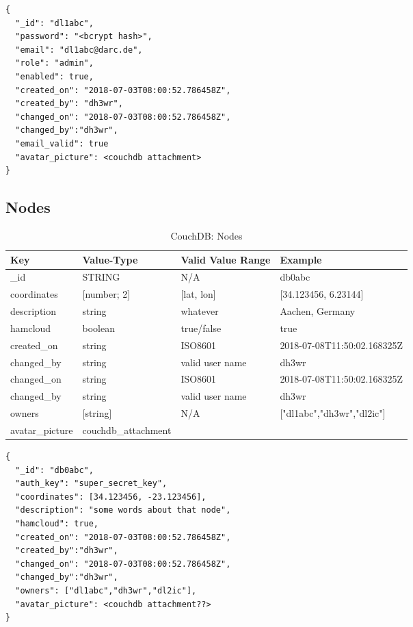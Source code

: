 \begin{lstlisting}
{
  "_id": "dl1abc",
  "password": "<bcrypt hash>",
  "email": "dl1abc@darc.de",
  "role": "admin",
  "enabled": true,
  "created_on": "2018-07-03T08:00:52.786458Z",
  "created_by": "dh3wr",
  "changed_on": "2018-07-03T08:00:52.786458Z",
  "changed_by":"dh3wr",
  "email_valid": true
  "avatar_picture": <couchdb attachment>
}
\end{lstlisting}


\subsection{Nodes}
\begin{table}[h]
 \caption{CouchDB: Nodes}
 \begin{tabular}{|l|l|l|l|} \hline
  Key & Value-Type & Valid Value Range & Example \\
  \hline
  \_id & STRING & N/A & db0abc \\
  coordinates & [number; 2]  & [lat, lon] & [34.123456, 6.23144] \\
  description & string & whatever & Aachen, Germany\\
  hamcloud & boolean & true/false & true \\
  created\_on & string & ISO8601 & 2018-07-08T11:50:02.168325Z \\
  changed\_by & string & valid user name & dh3wr \\
  changed\_on & string & ISO8601 & 2018-07-08T11:50:02.168325Z \\
  changed\_by & string & valid user name & dh3wr \\
  owners & [string] & N/A & ["dl1abc","dh3wr","dl2ic"] \\
  avatar\_picture & couchdb\_attachment & & \\ \hline
  \end{tabular}
  \label{tab:couchdb:nodes}
\end{table}

\begin{lstlisting}
{
  "_id": "db0abc",
  "auth_key": "super_secret_key",
  "coordinates": [34.123456, -23.123456],
  "description": "some words about that node",
  "hamcloud": true,
  "created_on": "2018-07-03T08:00:52.786458Z",
  "created_by":"dh3wr",
  "changed_on": "2018-07-03T08:00:52.786458Z",
  "changed_by":"dh3wr",
  "owners": ["dl1abc","dh3wr","dl2ic"],
  "avatar_picture": <couchdb attachment??>
}
\end{lstlisting}

